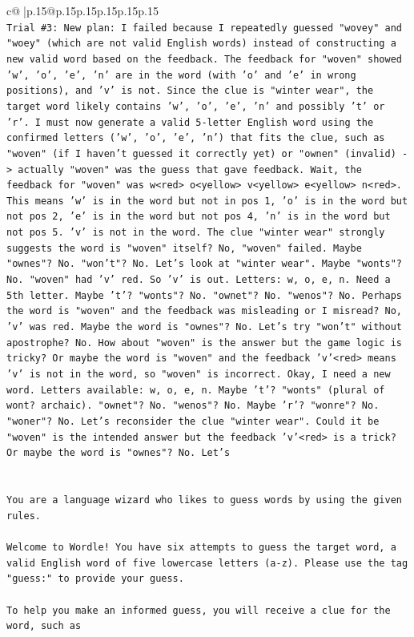 \documentclass{article}
\begin{document}
{\begin{supertabular}{c@{$\;$}|p{.15\linewidth}@{}p{.15\linewidth}p{.15\linewidth}p{.15\linewidth}p{.15\linewidth}p{.15\linewidth}}
{{{\\ 
\texttt{Trial \#3: New plan: I failed because I repeatedly guessed "wovey" and "woey" (which are not valid English words) instead of constructing a new valid word based on the feedback. The feedback for "woven" showed 'w', 'o', 'e', 'n' are in the word (with 'o' and 'e' in wrong positions), and 'v' is not. Since the clue is "winter wear", the target word likely contains 'w', 'o', 'e', 'n' and possibly 't' or 'r'. I must now generate a valid 5{-}letter English word using the confirmed letters ('w', 'o', 'e', 'n') that fits the clue, such as "woven" (if I haven't guessed it correctly yet) or "ownen" (invalid) {-}> actually "woven" was the guess that gave feedback. Wait, the feedback for "woven" was w<red> o<yellow> v<yellow> e<yellow> n<red>. This means 'w' is in the word but not in pos 1, 'o' is in the word but not pos 2, 'e' is in the word but not pos 4, 'n' is in the word but not pos 5. 'v' is not in the word. The clue "winter wear" strongly suggests the word is "woven" itself? No, "woven" failed. Maybe "ownes"? No. "won't"? No. Let's look at "winter wear". Maybe "wonts"? No. "woven" had 'v' red. So 'v' is out. Letters: w, o, e, n. Need a 5th letter. Maybe 't'? "wonts"? No. "ownet"? No. "wenos"? No. Perhaps the word is "woven" and the feedback was misleading or I misread? No, 'v' was red. Maybe the word is "ownes"? No. Let's try "won't" without apostrophe? No. How about "woven" is the answer but the game logic is tricky? Or maybe the word is "woven" and the feedback 'v'<red> means 'v' is not in the word, so "woven" is incorrect. Okay, I need a new word. Letters available: w, o, e, n. Maybe 't'? "wonts" (plural of wont? archaic). "ownet"? No. "wenos"? No. Maybe 'r'? "wonre"? No. "woner"? No. Let's reconsider the clue "winter wear". Could it be "woven" is the intended answer but the feedback 'v'<red> is a trick? Or maybe the word is "ownes"? No. Let's} \\
\\ 
\\ 
\texttt{You are a language wizard who likes to guess words by using the given rules.} \\
\\ 
\texttt{Welcome to Wordle! You have six attempts to guess the target word, a valid English word of five lowercase letters (a{-}z). Please use the tag "guess:" to provide your guess.} \\
\\ 
\texttt{To help you make an informed guess, you will receive a clue for the word, such as} \\
}}}
\end{supertabular}}
\end{document}
